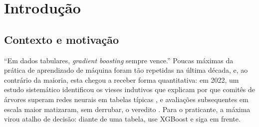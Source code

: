 
\chapter{Introdução}
\label{chap:introducao}

\section{Contexto e motivação}
\label{sec:intro-contexto}

``Em dados tabulares, \emph{gradient boosting} sempre vence.'' Poucas
máximas da prática de aprendizado de máquina foram tão repetidas na última
década, e, ao contrário da maioria, esta chegou a receber forma
quantitativa: em 2022, um estudo sistemático identificou os vieses
indutivos que explicam por que comitês de árvores superam redes neurais em
tabelas típicas \citep{grinsztajn2022}, e avaliações subsequentes em escala
maior matizaram, sem derrubar, o veredito \citep{mcelfresh2023}. Para o
praticante, a máxima virou atalho de decisão: diante de uma tabela, use
XGBoost e siga em frente.

